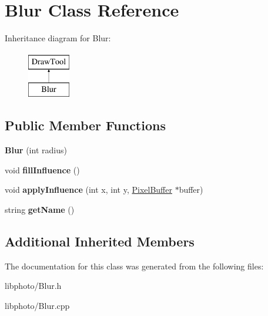 \hypertarget{classBlur}{\section{Blur Class Reference}
\label{classBlur}
}
Inheritance diagram for Blur\-:\begin{figure}[H]
\begin{center}
\leavevmode
\includegraphics[height=2.000000cm]{classBlur}
\end{center}
\end{figure}
\subsection*{Public Member Functions}
\begin{DoxyCompactItemize}
\item 
\hypertarget{classBlur_a4cf976a139e3745e022c6b4fb7b18efb}{{\bfseries Blur} (int radius)}\label{classBlur_a4cf976a139e3745e022c6b4fb7b18efb}

\item 
\hypertarget{classBlur_a6db41e9d70814abd7d188eee08779c7a}{void {\bfseries fill\-Influence} ()}\label{classBlur_a6db41e9d70814abd7d188eee08779c7a}

\item 
\hypertarget{classBlur_a74a6e5acef4b46edc5c79e909296ff53}{void {\bfseries apply\-Influence} (int x, int y, \hyperlink{classPixelBuffer}{Pixel\-Buffer} $\ast$buffer)}\label{classBlur_a74a6e5acef4b46edc5c79e909296ff53}

\item 
\hypertarget{classBlur_ad04ff612443d12024ae057ae757e6271}{string {\bfseries get\-Name} ()}\label{classBlur_ad04ff612443d12024ae057ae757e6271}

\end{DoxyCompactItemize}
\subsection*{Additional Inherited Members}


The documentation for this class was generated from the following files\-:\begin{DoxyCompactItemize}
\item 
libphoto/Blur.\-h\item 
libphoto/Blur.\-cpp\end{DoxyCompactItemize}
